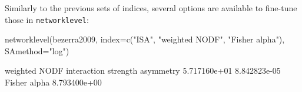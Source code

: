 \documentclass[a4paper, 11pt]{article}\usepackage[]{graphicx}\usepackage[]{color}
\begin{document}
\noindent Similarly to the previous sets of indices, several options are available to fine-tune those in \texttt{networklevel}:
\begin{Schunk}
\begin{Sinput}
networklevel(bezerra2009, index=c("ISA", "weighted NODF", "Fisher alpha"), 
             SAmethod="log")
\end{Sinput}
\begin{Soutput}
                 weighted NODF interaction strength asymmetry 
                  5.717160e+01                   8.842823e-05 
                  Fisher alpha 
                  8.793400e+00 
\end{Soutput}
\end{Schunk}
\end{document}
